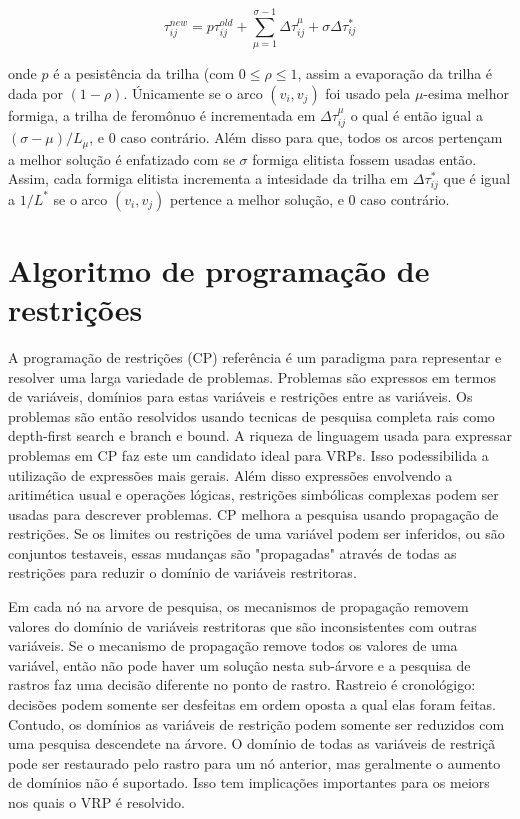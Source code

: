 \documentclass[a4paper, 12pt]{article}
\begin{document}
\[\tau^{new}_{ij} = p \tau^{old}_{ij} + \sum_{\mu=1}^{\sigma-1} \Delta\tau^{\mu}_{ij}+\sigma
\Delta\tau^{*}_{ij}\]

 onde $p$ é a pesistência da trilha (com $0 \leq \rho \leq 1$, assim a evaporação da trilha é dada
por $(1-\rho)$. Únicamente se o arco $(v_i, v_j)$ foi usado pela $\mu$-esima melhor formiga, a
trilha de feromônuo é incrementada em $\Delta \tau_{ij}^\mu$ o qual é então igual a $(\sigma -
\mu)/L_\mu$, e $0$ caso contrário. Além disso para que, todos os arcos pertençam a melhor solução
é enfatizado com se $\sigma$ formiga elitista fossem usadas então. Assim, cada formiga elitista
incrementa a intesidade da trilha em $\Delta \tau_{ij}^*$ que é igual a $1/L^*$ se o arco $(v_i,
v_j)$ pertence a melhor solução, e $0$ caso contrário.


\section{Algoritmo de programação de restrições}

 A programação de restrições (CP) {\color{red} referência} é um paradigma para representar e
resolver uma larga variedade de problemas. Problemas são expressos em termos de variáveis, domínios
para estas variáveis e restrições entre as variáveis. Os problemas são então resolvidos usando
tecnicas de pesquisa completa rais como depth-first search e branch e bound. A riqueza de linguagem
usada para expressar problemas em CP faz este um candidato ideal para VRPs. Isso podessibilida a
utilização de expressões mais gerais. Além disso expressões envolvendo a aritimética usual e
operações lógicas, restrições simbólicas complexas podem ser usadas para descrever problemas. CP
melhora a pesquisa usando propagação de restrições. Se os limites ou restrições de uma variável
podem ser inferidos, ou são conjuntos testaveis, essas mudanças são "propagadas" através de todas as
restrições para reduzir o domínio de variáveis restritoras.

 Em cada nó na arvore de pesquisa, os mecanismos de propagação removem valores do domínio de
variáveis restritoras que são inconsistentes com outras variáveis. Se o mecanismo de propagação
remove todos os valores de uma variável, então não pode haver um solução nesta sub-árvore e a
pesquisa de rastros faz uma decisão diferente no ponto de rastro. Rastreio é cronológigo: decisões
podem somente ser desfeitas em ordem oposta a qual elas foram feitas. Contudo, os domínios as
variáveis de restrição podem somente ser reduzidos com uma pesquisa descendete na árvore. O domínio
de todas as variáveis de restriçã pode ser restaurado pelo rastro para um nó anterior, mas
geralmente o aumento de domínios não é suportado. Isso tem implicações importantes para os meiors
nos quais o VRP é resolvido.
\end{document}
